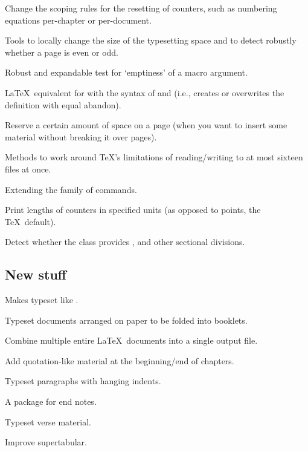 \documentclass{ltugboat}
\begin{document}
\begin{description}[font=\normalfont\sffamily]
\item [chngcntr] Change the scoping rules for the resetting of counters, such as numbering equations per-chapter or per-document.
\item [chngpage \& changepage] Tools to locally change the size of the typesetting space and to detect robustly whether a page is even or odd.
\item [ifmtarg] Robust and expandable test for `emptiness' of a macro argument.
\item [makecmds] \LaTeX\ equivalent for  with the syntax of  and  (i.e., creates or overwrites the definition with equal abandon).
\item [needspace] Reserve a certain amount of space on a page (when you want to insert some material without breaking it over pages).
\item [newfile]  Methods to work around \TeX's limitations of reading/writing to at most sixteen files at once.
\item [nextpage] Extending the family of  commands.
\item [printlen] Print lengths of counters in specified units (as opposed to points, the \TeX\ default).
\item [stdclsdv] Detect whether the class provides , and other sectional divisions.
\end{description}

\subsection{New stuff}

\begin{description}[font=\normalfont\sffamily]
\item [anonchap] Makes  typeset like .
\item [booklet]  Typeset documents arranged on paper to be folded into booklets.
\item [combine]  Combine multiple entire \LaTeX\ documents into a single output file.
\item [epigraph] Add quotation-like material at the beginning/end of chapters.
\item [hanging]  Typeset paragraphs with hanging indents.
\item [pagenote] A package for end notes.
\item [verse] Typeset verse material.
\item [xtab] Improve \textsf{supertabular}.
\end{description}
\end{document}
